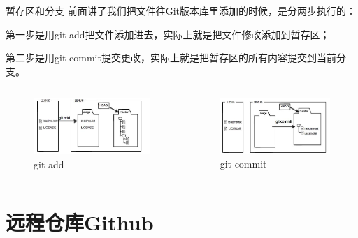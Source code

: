 \documentclass[hyperref,UTF8,10pt]{beamer}
\numberwithin{equation}{section} %
\begin{document}
\begin{frame}{暂存区和分支}
    前面讲了我们把文件往Git版本库里添加的时候，是分两步执行的：

    第一步是用git add把文件添加进去，实际上就是把文件修改添加到暂存区；
    
    第二步是用git commit提交更改，实际上就是把暂存区的所有内容提交到当前分支。
\begin{columns}
\begin{column}{.5\textwidth}
    \begin{figure}
    \centering
    \includegraphics[width=\textwidth]{add.PNG}
    \caption{git add}
    \end{figure}
\end{column}
\begin{column}{.5\textwidth}
    \begin{figure}
    \centering
    \includegraphics[width=\textwidth]{commit.PNG}
    \caption{git commit}
    \end{figure}
\end{column}
\end{columns}

\end{frame}


\section{远程仓库Github}
\end{document}
